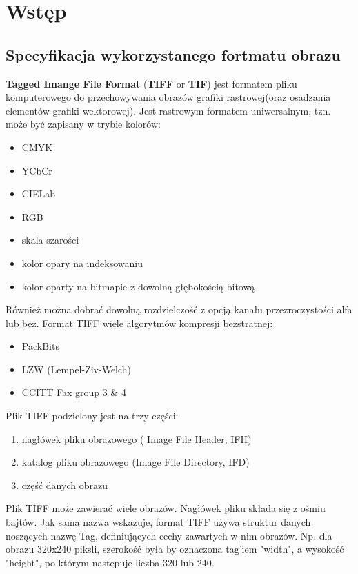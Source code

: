 \documentclass[final,a4paper,openany,12pt]{mwbk}
\begin{document}
\tableofcontents
\listoffigures

\sloppy



\chapter{Wstęp}

\section {Specyfikacja wykorzystanego fortmatu obrazu}
\textbf{Tagged Imange File Format} (\textbf{TIFF} or \textbf{TIF}) jest formatem pliku komputerowego do przechowywania obrazów grafiki rastrowej(oraz osadzania elementów grafiki wektorowej). Jest rastrowym formatem uniwersalnym, tzn. może być zapisany w trybie kolorów:
\begin{itemize}
	\item CMYK
	\item YCbCr
	\item CIELab
	\item RGB
	\item skala szarości
	\item kolor opary na indeksowaniu
	\item kolor oparty na bitmapie z dowolną głębokością bitową
\end{itemize}
Również można dobrać dowolną rozdzielczość z opcją kanału przezroczystości alfa lub bez.
Format TIFF wiele algorytmów kompresji bezstratnej:
\begin{itemize}
	\item PackBits
	\item LZW (Lempel-Ziv-Welch)
	\item CCITT Fax group 3 \& 4
\end{itemize}
Plik TIFF podzielony jest na trzy części:
\begin{enumerate}
	\item nagłówek pliku obrazowego ( Image File Header, IFH)
	\item katalog pliku obrazowego (Image File Directory, IFD)
	\item część danych obrazu
\end{enumerate}
Plik TIFF może zawierać wiele obrazów. Nagłówek pliku składa się
z ośmiu bajtów. Jak sama nazwa wskazuje, format TIFF używa struktur danych noszących nazwę Tag, definiujących cechy zawartych w nim obrazów. Np. dla obrazu 320x240 piksli, szerokość była by oznaczona tag'iem "width", a wysokość "height", po którym następuje liczba 320 lub 240.
\end{document}
